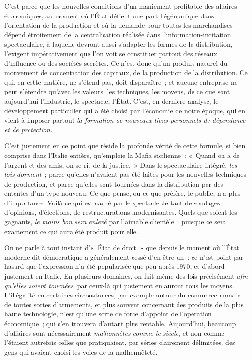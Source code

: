 \documentclass[french,twoside]{book} %
\def\bignobreak{\ifdim\lastskip<\bigskipamount
  \removelastskip\nopagebreak\bigskip\fi}
\newcommand{\labelblock}[1]{\bigbreak{\color{rubric}\noindent\textbf{#1}\par}\bignobreak}
\begin{document}
\labelblock{XXVI}

\noindent C’est parce que les nouvelles conditions d’un maniement profitable des affaires économiques, au moment où l’État détient une part hégémonique dans l’orientation de la production et où la demande pour toutes les marchandises dépend étroitement de la centralisation réalisée dans l’information-incitation spectaculaire, à laquelle devront aussi s’adapter les formes de la distribution, l’exigent impérativement que l’on voit se constituer partout des réseaux d’influence ou des sociétés secrètes. Ce n’est donc qu’un produit naturel du mouvement de concentration des capitaux, de la production de la distribution. Ce qui, en cette matière, ne s’étend pas, doit disparaître ; et aucune entreprise ne peut s’étendre qu’avec les valeurs, les techniques, les moyens, de ce que sont aujourd’hui l’industrie, le spectacle, l’État. C’est, en dernière analyse, le développement particulier qui a été choisi par l’économie de notre époque, qui en vient à imposer partout \emph{la formation de nouveaux liens personnels de dépendance et de protection.}\par
C’est justement en ce point que réside la profonde vérité de cette formule, si bien comprise dans l’Italie entière, qu’emploie la Mafia sicilienne : « Quand on a de l’argent et des amis, on se rit de la justice. » Dans le spectaculaire intégré, \emph{les lois dorment} ; parce qu’elles n’avaient pas été faites pour les nouvelles techniques de production, et parce qu’elles sont tournées dans la distribution par des ententes d’un type nouveau. Ce que pense, ou ce que préfère, le public, n’a plus d’importance. Voilà ce qui est caché par le spectacle de tant de sondages d’opinions, d’élections, de restructurations modernisantes. Quels que soient les gagnants, \emph{le moins bon sera enlevé} par l’aimable clientèle : puisque ce sera exactement ce qui aura été produit pour elle.\par
On ne parle à tout instant d’« État de droit » que depuis le moment où l’État moderne dit démocratique a généralement cessé d’en être un : ce n’est point par hasard que l’expression n’a été popularisée que peu après 1970, et d’abord justement en Italie. En plusieurs domaines, on fait même des lois précisément \emph{afin qu’elles soient tournées}, par ceux-là qui justement en auront tous les moyens. L’illégalité en certaines circonstances, par exemple autour du commerce mondial de toutes sortes d’armements, et plus souvent concernant des produits de la plus haute technologie, n’est qu’une sorte de force d’appoint de l’opération économique ; qui s’en trouvera d’autant plus rentable. Aujourd’hui, beaucoup d’affaires sont nécessairement \emph{malhonnêtes comme le siècle}, et non comme l’étaient autrefois celles que pratiquaient, par séries clairement délimitées, des gens qui avaient choisi les voies de la malhonnêteté.\par
\end{document}
